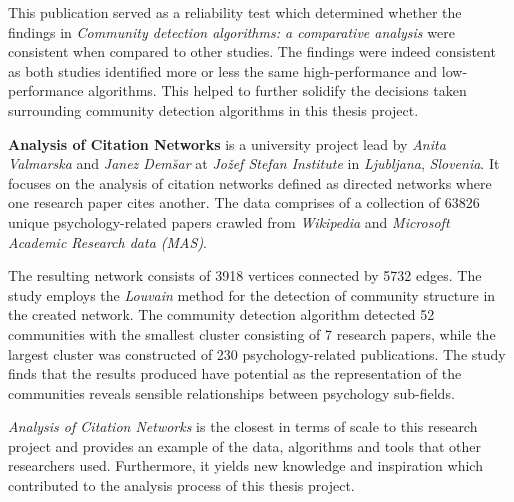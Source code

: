 This publication served as a reliability test which determined whether the findings in \textit{Community detection algorithms: a comparative analysis} were consistent when compared to other studies. The findings were indeed consistent as both studies identified more or less the same high-performance and low-performance algorithms. This helped to further solidify the decisions taken surrounding community detection algorithms in this thesis project.

\vspace*{1em}

\textbf{Analysis of Citation Networks} is a university project lead by \textit{Anita Valmarska} and \textit{Janez Dem\u{s}ar} at \textit{Jo\v{z}ef Stefan Institute} in \textit{Ljubljana}, \textit{Slovenia}. It focuses on the analysis of citation networks defined as directed networks where one research paper cites another. The data comprises of a collection of 63826 unique psychology-related papers crawled from \textit{Wikipedia} and \textit{Microsoft Academic Research data (MAS)}.

The resulting network consists of 3918 vertices connected by 5732 edges. The study employs the \textit{Louvain} method for the detection of community structure in the created network. The community detection algorithm detected 52 communities with the smallest cluster consisting of 7 research papers, while the largest cluster was constructed of 230 psychology-related publications. The study finds that the results produced have potential as the representation of the communities reveals sensible relationships between psychology sub-fields.

\textit{Analysis of Citation Networks} is the closest in terms of scale to this research project and provides an example of the data, algorithms and tools that other researchers used. Furthermore, it yields new knowledge and inspiration which contributed to the analysis process of this thesis project.